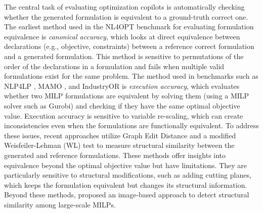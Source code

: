 The central task of evaluating optimization copilots 
is automatically checking 
whether the generated formulation 
is equivalent to a ground-truth correct one.
The earliest method used in the NL4OPT benchmark \citep{ramamonjison23} for evaluating formulation equivalence is \emph{canonical accuracy}, which looks at direct equivalence between declarations (e.g., objective, constraints) between a reference correct formulation and a generated formulation. 
This method is sensitive to permutations of the order of the declarations in a formulation and fails when multiple valid formulations exist for the same problem. 
The method used in benchmarks such as NLP4LP \citep{Ahmaditeshizi24}, MAMO \cite{huang24}, and IndustryOR \citep{tang24} is \emph{execution accuracy}, which evaluates whether two MILP formulations are equivalent by solving them (using a MILP solver such as Gurobi) and checking if they have the same optimal objective value. 
Execution accuracy is sensitive to variable re-scaling, which can create inconsistencies even when the formulations are functionally equivalent. 
To address these issues, recent approaches utilize Graph Edit Distance \citep{xing24} and a modified Weisfeiler-Lehman (WL) test \cite{wang24} to measure structural similarity between the generated and reference formulations. 
These methods offer insights into equivalence beyond the optimal objective value but have limitations.
They are particularly sensitive to structural modifications, such as adding cutting planes, 
which keeps the formulation equivalent but changes its structural information. 
Beyond these methods, \citet{steever22} proposed an image-based approach to detect structural similarity among large-scale MILPs.